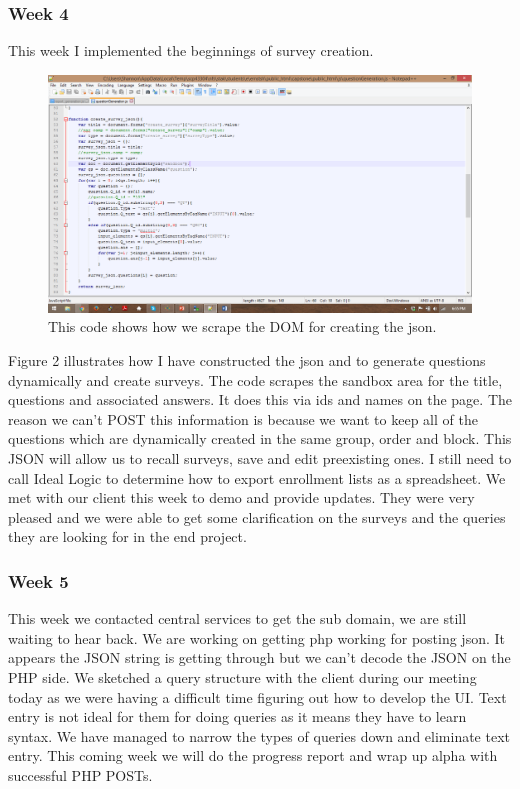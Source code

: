 \documentclass[letterpaper,10pt,serif, draftclsnofoot,onecolumn, compsoc, titlepage]{IEEEtran}
\begin{document}
\subsubsection{Week 4}
This week I implemented the beginnings of survey creation.
\begin{figure}
\includegraphics[scale=.5, width=\textwidth]{code_snippet_2.png}
\caption{This code shows how we scrape the DOM for creating the json.}
\label{fig:code2}
\end{figure}
Figure 2 illustrates how I have constructed the json and to generate questions dynamically and create surveys. The code scrapes 
the sandbox area for the title, questions and associated answers. It does this via ids and names on the page. The reason we can't 
POST this information is because we want to keep all of the questions which are dynamically created in the same group, order and 
block. This JSON will allow us to recall surveys, save and edit preexisting ones.
I still need to call Ideal Logic to determine how to export enrollment lists as a spreadsheet. We met with our client this week to demo and provide updates. They were very pleased and we were able to get some clarification on the surveys and the queries they are 
looking for in the end project. 
\subsubsection{Week 5}
This week we contacted central services to get the sub domain, we are still waiting to hear back.
We are working on getting php working for posting json. It appears the JSON string is getting through but we can't decode the 
JSON on the PHP side. We sketched a query structure with the client during our meeting today as we were having a difficult time 
figuring out how to develop the UI. Text entry is not ideal for them for doing queries as it means they have to learn syntax. We have managed to narrow the types of queries down and eliminate text entry. 
This coming week we will do the progress report and wrap up alpha with successful PHP POSTs.
\end{document}
